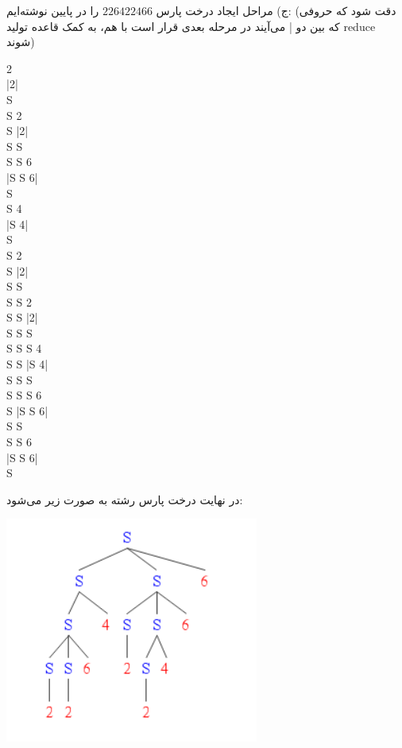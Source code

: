 ج) مراحل ایجاد درخت پارس $226422466$ را در پایین نوشته‌ایم: (دقت شود که حروفی که بین دو | می‌آیند در مرحله بعدی قرار است با هم، به کمک قاعده تولید reduce شوند)
\begin{latin}
	2
	\\
	|2|
	\\
	S
	\\
	S 2
	\\
	S |2|
	\\
	S S
	\\
	S S 6
	\\
	|S S 6|
	\\
	S
	\\
	S 4
	\\
	|S 4|
	\\
	S
	\\
	S 2
	\\
	S |2|
	\\
	S S
	\\
	S S 2
	\\
	S S |2|
	\\
	S S S
	\\
	S S S 4
	\\
	S S |S 4|
	\\
	S S S
	\\
	S S S 6
	\\
	S |S S 6|
	\\
	S S
	\\
	S S 6
	\\
	|S S 6|
	\\
	S
\end{latin}
در نهایت درخت پارس رشته به صورت زیر می‌شود:
\begin{center}
	\includegraphics{226422466.png}
\end{center}


